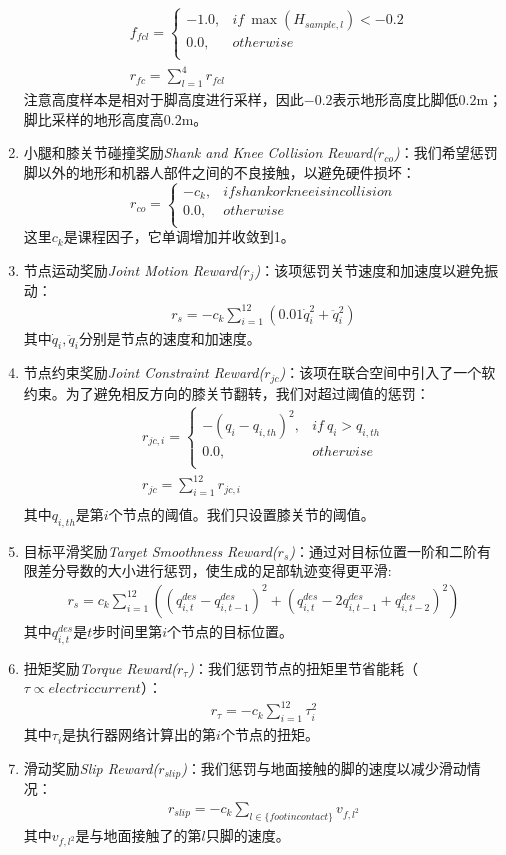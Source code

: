 \begin{enumerate}
\begin{align}
    &f_{fcl}=
    \begin{cases}
    -1.0, & if\ \max(H_{sample,l})<-0.2\\
    0.0, &otherwise\\
    \end{cases}\\
    &r_{fc}=\sum_{l=1}^{4}r_{fcl}
  \end{align}注意高度样本是相对于脚高度进行采样，因此$-0.2$表示地形高度比脚低$0.2$m；脚比采样的地形高度高$0.2$m。
  \item 小腿和膝关节碰撞奖励\emph{Shank and Knee Collision Reward($r_{co}$)}：我们希望惩罚脚以外的地形和机器人部件之间的不良接触，以避免硬件损坏：$$r_{co}=\begin{cases}
    -c_k, & if shank or knee is in collision\\
    0.0, & otherwise\\
  \end{cases}$$这里$c_k$是课程因子，它单调增加并收敛到1。
  \item 节点运动奖励\emph{Joint Motion Reward($r_{j}$)}：该项惩罚关节速度和加速度以避免振动：\begin{align}
    r_s=-c_k\sum_{i=1}^{12}(0.01\dot q_i^2+\ddot q_i^2)
  \end{align}其中$\dot q_i, \ddot q_i$分别是节点的速度和加速度。
  \item 节点约束奖励\emph{Joint Constraint Reward($r_{jc}$)}：该项在联合空间中引入了一个软约束。为了避免相反方向的膝关节翻转，我们对超过阈值的惩罚：\begin{align}
    r_{jc,i}=\begin{cases}
      -(q_i-q_{i,th})^2, & if\ q_i>q_{i,th}\\
      0.0, & otherwise\\
    \end{cases}\\
    r_{jc}=\sum_{i=1}^{12}r_{jc,i}\\
  \end{align}其中$q_{i,th}$是第$i$个节点的阈值。我们只设置膝关节的阈值。
  \item 目标平滑奖励\emph{Target Smoothness Reward($r_{s}$)}：通过对目标位置一阶和二阶有限差分导数的大小进行惩罚，使生成的足部轨迹变得更平滑:\begin{align}
    r_s=c_k\sum_{i=1}^{12}((q_{i,t}^{des}-q_{i,t-1}^{des})^2+(q_{i,t}^{des}-2q_{i,t-1}^{des}+q_{i,t-2}^{des})^2)
  \end{align}其中$q_{i,t}^{des}$是$t$步时间里第$i$个节点的目标位置。
  \item 扭矩奖励\emph{Torque Reward($r_{\tau}$)}：我们惩罚节点的扭矩里节省能耗（$\tau\propto electric current$）：\begin{align}
    r_{\tau}=-c_k\sum_{i=1}^{12}\tau_i^2
  \end{align}其中$\tau_i$是执行器网络计算出的第$i$个节点的扭矩。
  \item 滑动奖励\emph{Slip Reward($r_{slip}$)}：我们惩罚与地面接触的脚的速度以减少滑动情况：\begin{align}
    r_{slip}=-c_k\sum_{l\in \{foot in contact\}}v_{f,l^2}
  \end{align}其中$v_{f,l^2}$是与地面接触了的第$l$只脚的速度。
\end{enumerate}
